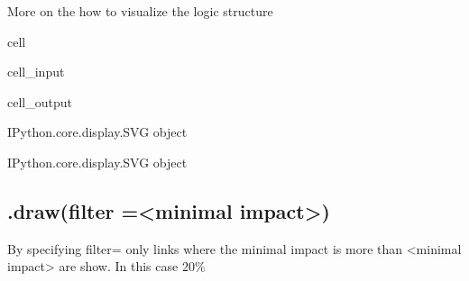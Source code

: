 \documentclass[letterpaper,10pt,english]{jupyterBook}
\begin{document}
\sphinxAtStartPar
More on the how to visualize the logic structure {\hyperref[\detokenize{content/howto/structure/Logical_structure::doc}]{}}

\begin{sphinxuseclass}{cell}\begin{sphinxVerbatimInput}

\begin{sphinxuseclass}{cell_input}
\begin{sphinxVerbatim}[commandchars=\\\{\}]
\PYG{p}{[}\PYG{p}{]}  
\end{sphinxVerbatim}

\end{sphinxuseclass}\end{sphinxVerbatimInput}
\begin{sphinxVerbatimOutput}

\begin{sphinxuseclass}{cell_output}
\begin{sphinxVerbatim}[commandchars=\\\{\}]
\PYGZlt{}IPython.core.display.SVG object\PYGZgt{}
\end{sphinxVerbatim}

\begin{sphinxVerbatim}[commandchars=\\\{\}]
\PYGZlt{}IPython.core.display.SVG object\PYGZgt{}
\end{sphinxVerbatim}

\end{sphinxuseclass}\end{sphinxVerbatimOutput}

\end{sphinxuseclass}

\subsection{.draw(filter =<minimal impact>)}
\label{\detokenize{content/Python/modelflow_features:draw-filter-minimal-impact}}
\sphinxAtStartPar
By specifying filter=  only links where the minimal impact is more than <minimal impact> are show. In this case 20\%
\end{document}
